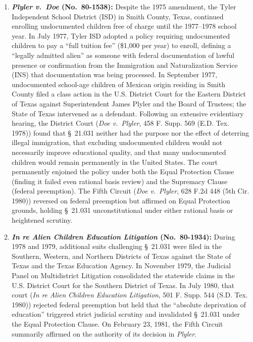 \documentclass[12pt]{article}
\begin{document}
\begin{enumerate}
    \item \textbf{\textit{Plyler v.\ Doe} (No.\ 80-1538):} Despite the 1975 amendment, the Tyler Independent School District (ISD) in Smith County, Texas, continued enrolling undocumented children free of charge until the 1977--1978 school year. In July 1977, Tyler ISD adopted a policy requiring undocumented children to pay a ``full tuition fee'' (\$1,000 per year) to enroll, defining a ``legally admitted alien'' as someone with federal documentation of lawful presence or confirmation from the Immigration and Naturalization Service (INS) that documentation was being processed. In September 1977, undocumented school-age children of Mexican origin residing in Smith County filed a class action in the U.S. District Court for the Eastern District of Texas against Superintendent James Plyler and the Board of Trustees; the State of Texas intervened as a defendant. Following an extensive evidentiary hearing, the District Court (\textit{Doe v.\ Plyler}, 458 F. Supp. 569 (E.D. Tex. 1978)) found that \S~21.031 neither had the purpose nor the effect of deterring illegal immigration, that excluding undocumented children would not necessarily improve educational quality, and that many undocumented children would remain permanently in the United States. The court permanently enjoined the policy under both the Equal Protection Clause (finding it failed even rational basis review) and the Supremacy Clause (federal preemption). The Fifth Circuit (\textit{Doe v.\ Plyler}, 628 F.2d 448 (5th Cir. 1980)) reversed on federal preemption but affirmed on Equal Protection grounds, holding \S~21.031 unconstitutional under either rational basis or heightened scrutiny.
    \item \textbf{\textit{In re Alien Children Education Litigation} (No.\ 80-1934):} During 1978 and 1979, additional suits challenging \S~21.031 were filed in the Southern, Western, and Northern Districts of Texas against the State of Texas and the Texas Education Agency. In November 1979, the Judicial Panel on Multidistrict Litigation consolidated the statewide claims in the U.S. District Court for the Southern District of Texas. In July 1980, that court (\textit{In re Alien Children Education Litigation}, 501 F. Supp. 544 (S.D. Tex. 1980)) rejected federal preemption but held that the ``absolute deprivation of education'' triggered strict judicial scrutiny and invalidated \S~21.031 under the Equal Protection Clause. On February 23, 1981, the Fifth Circuit summarily affirmed on the authority of its decision in \textit{Plyler}.
\end{enumerate}
\end{document}
